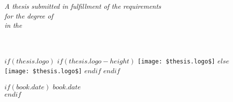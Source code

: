 {\begin{titlepage}
\begin{center}
    \vfill
    
    \large \textit{A thesis submitted in fulfillment of the requirements\\ for the degree of \degreename}\\[0.3cm] %
    \textit{in the}\\[0.4cm]
    \groupname\\
    \deptname\\[2cm] %
     
    \vfill
    
    $if(thesis.logo)$
    $if(thesis.logo-height)$
    \texttt{[image: \$thesis.logo\$]} %
    $else$
    \texttt{[image: \$thesis.logo\$]}
    $endif$
    $endif$
    
    $if(book.date)$
    {\large $book.date$}\\[4cm] %
    $endif$
    
    \vfill
    \end{center}
    \end{titlepage}
  }
\else
